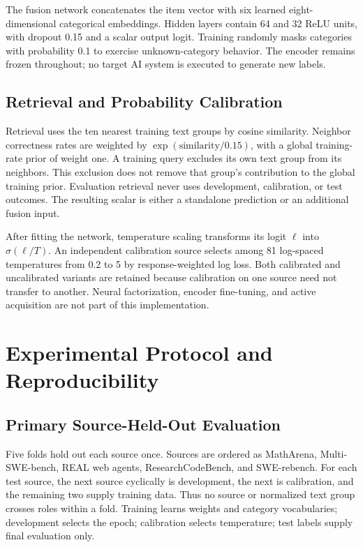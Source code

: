 \documentclass[conference]{IEEEtran}
\begin{document}
The fusion network concatenates the item vector with six learned eight-dimensional categorical embeddings. Hidden layers contain 64 and 32 ReLU units, with dropout 0.15 and a scalar output logit. Training randomly masks categories with probability 0.1 to exercise unknown-category behavior. The encoder remains frozen throughout; no target AI system is executed to generate new labels.


\subsection{Retrieval and Probability Calibration}
Retrieval uses the ten nearest training text groups by cosine similarity. Neighbor correctness rates are weighted by $\exp(\mathrm{similarity}/0.15)$, with a global training-rate prior of weight one. A training query excludes its own text group from its neighbors. This exclusion does not remove that group's contribution to the global training prior. Evaluation retrieval never uses development, calibration, or test outcomes. The resulting scalar is either a standalone prediction or an additional fusion input.

After fitting the network, temperature scaling transforms its logit $\ell$ into $\sigma(\ell/T)$. An independent calibration source selects among 81 log-spaced temperatures from 0.2 to 5 by response-weighted log loss. Both calibrated and uncalibrated variants are retained because calibration on one source need not transfer to another. Neural factorization, encoder fine-tuning, and active acquisition are not part of this implementation.

\section{Experimental Protocol and Reproducibility}
\subsection{Primary Source-Held-Out Evaluation}
Five folds hold out each source once. Sources are ordered as MathArena, Multi-SWE-bench, REAL web agents, ResearchCodeBench, and SWE-rebench. For each test source, the next source cyclically is development, the next is calibration, and the remaining two supply training data. Thus no source or normalized text group crosses roles within a fold. Training learns weights and category vocabularies; development selects the epoch; calibration selects temperature; test labels supply final evaluation only.
\end{document}
